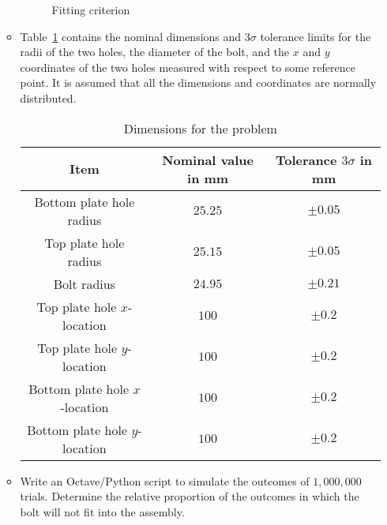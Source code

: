 \documentclass{article}
\begin{document}
\begin{enumerate}
\begin{itemize}
\begin{figure}[!htbp]
\begin{center}
				\caption{Fitting criterion}
				\label{fit_criterion}
				\end{center}
			\end{figure}
			\item
			Table~\ref{my_table} contains the nominal dimensions and $3\sigma$ tolerance limits for the radii of the two holes, the diameter of the bolt, and the $x$ and $y$ coordinates of the two holes measured with respect to some reference point. It is assumed that all the dimensions and coordinates are normally distributed.
			\begin{table}[!htbp]
				\caption{Dimensions for the problem}
				\label{my_table}
				\begin{center}
				\begin{tabular}{|c|c|c|}
					\hline
					\textbf{Item} & \textbf{Nominal value in mm} & \textbf{Tolerance $3\sigma$ in mm}\\
					\hline
					Bottom plate hole radius & $25.25$ & $\pm 0.05$\\
					\hline
					Top plate hole radius & $25.15$ & $\pm 0.05$\\
					\hline
					Bolt radius & $24.95$ & $\pm 0.21$\\
					\hline
					Top plate hole $x$-location & $100$ & $\pm 0.2$\\
					\hline
					Top plate hole $y$-location & $100$ & $\pm 0.2$\\
					\hline
					Bottom plate hole $x$-location & $100$ & $\pm 0.2$\\
					\hline
					Bottom plate hole $y$-location & $100$ & $\pm 0.2$\\
					\hline
				\end{tabular}
				\end{center}
			\end{table}
		\end{itemize}
		\begin{itemize}
			\item
		Write an Octave/Python script to simulate the outcomes of $1,000,000$ trials. Determine the relative proportion of the outcomes in which the bolt will not fit into the assembly.

\end{itemize}
\end{enumerate}
\end{document}
